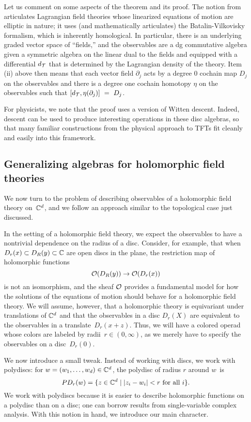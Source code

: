 \documentclass[11pt]{amsart}
\begin{document}
Let us comment on some aspects of the theorem and its proof.
The notion from \cite{CosBook} articulates Lagrangian field theories whose linearized equations of motion are elliptic in nature;
it uses (and mathematically articulates) the Batalin-Vilkovisky formalism,
which is inherently homological.
In particular, there is an underlying graded vector space of ``fields,''
and the observables are a dg commutative algebra given a symmetric algebra on the linear dual to the fields and equipped with a differential $d_\mathcal T$ that is determined by the Lagrangian density of the theory.
Item (ii) above then means that each vector field $\partial_j$ acts by a degree 0 cochain map $D_j$ on the observables and there is a degree one cochain homotopy $\eta$ on the observables such that $[d_\mathcal T, \eta(\partial_j)]~=~D_j$.

For physicists, we note that the proof uses a version of Witten descent.
Indeed, descent can be used to produce interesting operations in these disc algebras,
so that many familiar constructions from the physical approach to TFTs fit cleanly and easily into this framework.

\subsection{Generalizing algebras for holomorphic field theories}

We now turn to the problem of describing observables of a holomorphic field theory on~$\mathbb C^d$,
and we follow an approach similar to the topological case just discussed.

In the setting of a holomorphic field theory, we expect the observables to have a nontrivial dependence on the radius of a disc.
Consider, for example, that 
when $D_r(x) \subset D_R(y) \subset \mathbb C$ are open discs in the plane,
the restriction map of holomorphic functions
\[
\mathcal O(D_R(y))\to \mathcal O(D_r(x))
\]
is not an isomorphism,
and the sheaf $\mathcal O$ provides a fundamental model for how the solutions of the equations of motion should behave for a holomorphic field theory.
We will assume, however, that a holomorphic theory is equivariant under translations of $\mathbb C^d$ and that the observables in a disc $D_r(X)$ are equivalent to the observables in a translate~$D_r(x+z)$.
Thus, we will have a colored operad whose colors are labeled by radii~$r \in (0,\infty)$,
as we merely have to specify the observables on a disc~$D_r(0)$.

We now introduce a small tweak.
Instead of working with discs, we work with polydiscs: for $w = (w_1, \ldots, w_d) \in \mathbb C^d$, the polydisc of radius $r$ around $w$~is
\[
PD_r(w) = \{ z \in \mathbb C^d \;|\; |z_i - w_i| < r \text{ for all $i$}\}.
\]
We work with polydiscs because it is easier to describe holomorphic functions on a polydisc than on a disc;
one can borrow results from single-variable complex analysis.
With this notion in hand, we introduce our main character.
\end{document}
